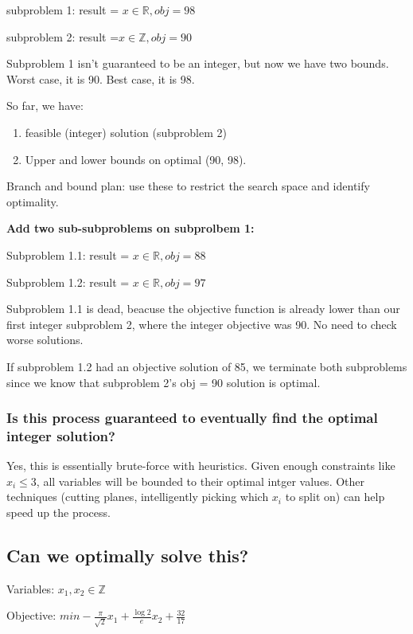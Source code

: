\documentclass[11pt]{article}
\begin{document}
subproblem 1: result = \(x \in \mathbb{R}, obj = 98\)

subproblem 2: result  =\(x \in \mathbb{Z}, obj = 90\)

Subproblem 1 isn't guaranteed to be an integer, but now we have two bounds. Worst case, it is 90. Best case, it is 98.

So far, we have:
\begin{enumerate}
\item feasible (integer) solution (subproblem 2)
\item Upper and lower bounds on optimal (90, 98).
\end{enumerate}

Branch and bound plan: use these to restrict the search space and identify optimality.

\textbf{\textbf{Add two sub-subproblems on subprolbem 1:}}

Subproblem 1.1: result = \(x \in \mathbb{R}, obj = 88\)

Subproblem 1.2: result = \(x \in \mathbb{R}, obj = 97\)

Subproblem 1.1 is dead, beacuse the objective function is already lower than our first integer subproblem 2, where the integer objective was 90. No need to check worse solutions.

If subproblem 1.2 had an objective solution of 85, we terminate both subproblems since we know that subproblem 2's obj = 90 solution is optimal.

\subsubsection{Is this process guaranteed to eventually find the optimal integer solution?}
\label{sec:org39add36}

Yes, this is essentially brute-force with heuristics. Given enough constraints like \(x_i \leq 3\), all variables will be bounded to their optimal intger values. Other techniques (cutting planes, intelligently picking which \(x_i\) to split on) can help speed up the process.


\subsection{Can we optimally solve this?}
\label{sec:org196c724}

Variables: \(x_1, x_2 \in \mathbb{Z}\)

Objective: \(min - \frac{\pi}{\sqrt{2}}x_1 + \frac{\log{2}}{e}x_2 + \frac{32}{17}\)
\end{document}
